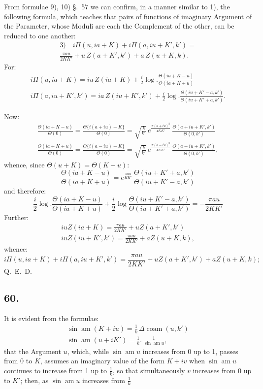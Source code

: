 \documentclass{article}
\begin{document}
From formulae 9), 10) §.\ 57 we can confirm, in a manner similar to 1), the following formula, which teaches that pairs of functions of imaginary Argument of the Parameter, whose Moduli are each the Complement of the other, can be reduced to one another:
\[
\begin{gathered}
\text{3)}\quad i\Pi(u,ia+K)+i\Pi(a,iu+K',k')=\\[1.5ex]
\frac{\pi au}{2KK'}+u\,Z(a+K',k')+a\,Z(u+K,k).
\end{gathered}
\]
For:
\[
\begin{gathered}
i\Pi(u,ia+K)=iu\,Z(ia+K)+\frac{i}{2}\log.\frac{\Theta(ia+K-u)}{\Theta(ia+K+u)}\\[1.5ex]
i\Pi(a,iu+K',k')=ia\,Z(iu+K',k')+\frac{i}{2}\log.\frac{\Theta(iu+K'-a,k')}{\Theta(iu+K'+a,k')}.
\end{gathered}
\]

Now:
\[
\begin{gathered}
\frac{\Theta(ia+K-u)}{\Theta(0)}=\frac{\Theta\{i(a+iu)+K\}}{\Theta(0)}=\sqrt{\frac{k}{k'}}\,e^{\frac{\pi(a+iu)^{2}}{4KK'}}\,\frac{\Theta(a+iu+K',k')}{\Theta(0,k')}\\[1.5ex]
\frac{\Theta(ia+K+u)}{\Theta(0)}=\frac{\Theta\{i(a-iu)+K\}}{\Theta(0)}=\sqrt{\frac{k}{k'}}\,e^{\frac{\pi(a-iu)^{2}}{4KK'}}\,\frac{\Theta(a-iu+K',k')}{\Theta(0,k')},
\end{gathered}
\]
whence, since $\Theta(u+K)=\Theta(K-u)$:
\[
\frac{\Theta(ia+K-u)}{\Theta(ia+K+u)}=e^{\frac{\pi au}{KK'}}\,\frac{\Theta(iu+K'+a,k')}{\Theta(iu+K'-a,k')}
\]
and therefore:
\[
\frac{i}{2}\log.\frac{\Theta(ia+K-u)}{\Theta(ia+K+u)}+\frac{i}{2}\log\frac{\Theta(iu+K'-a,k')}{\Theta(iu+K'+a,k')}=-\frac{\pi au}{2KK'}
\]
Further:
\[
\begin{gathered}
iuZ(ia+K)=\frac{\pi au}{2KK'}+uZ(a+K',k')\\[1.5ex]
iuZ(iu+K',k')=\frac{\pi au}{2KK'}+aZ(u+K,k),
\end{gathered}
\]
whence:
\[
i\Pi(u,ia+K)+i\Pi(a,iu+K',k')=\frac{\pi au}{2KK'}+uZ(a+K',k')+aZ(u+K,k);
\]
Q.\ E.\ D.

\subsection*{60.}

It is evident from the formulae:
\[
\begin{gathered}
\sin\operatorname{am}(K+iu)=\frac{1}{k}\,\Delta\operatorname{coam}(u,k')\\[1.5ex]
\sin\operatorname{am}(u+iK')=\frac{1}{k}.\,\frac{1}{\sin\operatorname{am}u},
\end{gathered}
\]
that the Argument $u$, which, while $\sin\operatorname{am}u$ increases from 0 up to 1, passes from 0 to $K$, assumes an imaginary value of the form $K+iv$ when $\sin\operatorname{am}u$ continues to increase from 1 up to $\frac{1}{k}$, so that simultaneously $v$ increases from 0 up to $K'$; then, as $\sin\operatorname{am}u$ increases from $\frac{1}{k}$
\end{document}
